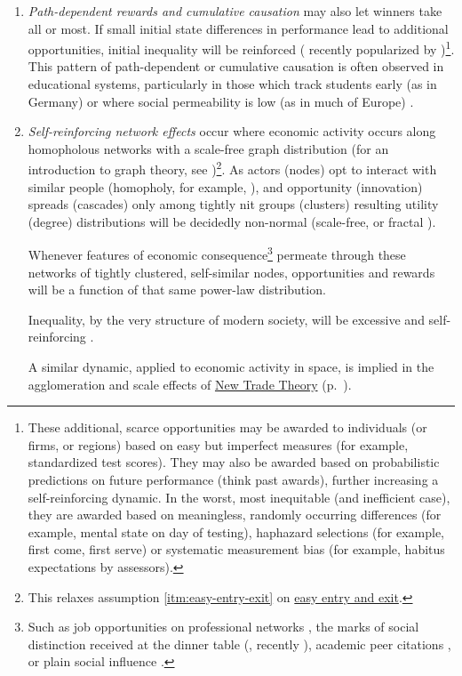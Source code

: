 \begin{enumerate}
	\item {} \label{sec:cumulative-causation} \emph{Path-dependent rewards and cumulative causation} may also let winners take all or most. If small initial state differences in performance lead to additional opportunities, initial inequality will be reinforced (\citealt{Jackson1968, Merton1988} recently popularized by \citealt{Gladwell})\footnote{
		These additional, scarce opportunities may be awarded to individuals (or firms, or regions) based on easy but imperfect measures (for example, standardized test scores). They may also be awarded based on probabilistic predictions on future performance (think past awards), further increasing a self-reinforcing dynamic. In the worst, most inequitable (and inefficient case), they are awarded based on meaningless, randomly occurring differences (for example, mental state on day of testing), haphazard selections (for example, first come, first serve) or systematic measurement bias (for example, habitus expectations by assessors).}. 
	This pattern of path-dependent or cumulative causation is often observed in educational systems, particularly in those which track students early (as in Germany) or where social permeability is low (as in much of Europe) \citep{OECD2006}.

	\item {} \label{sec:network-effects} \emph{Self-reinforcing network effects} occur where economic activity occurs along homopholous networks with a scale-free graph distribution (for an introduction to graph theory, see \citealt{Kleinberg-2009-oz})\footnote{
		This relaxes  assumption \ref{itm:easy-entry-exit} on \hyperref[itm:easy-entry-exit]{easy entry and exit}.}.
	As actors (nodes) opt to interact with similar people (homopholy, for example, \citealt{Mcpherson2001}), and opportunity (innovation) spreads (cascades) only among tightly nit groups (clusters) \citep{Bass1969} resulting utility (degree) distributions will be decidedly non-normal (scale-free, or fractal \citep{Mandelbrot2004}). 
	
	Whenever features of economic consequence\footnote{
		Such as job opportunities on professional networks \citep{Benkler2006}, the marks of social distinction received at the dinner table (\citealt{Bourdieu-1984-aa}, recently \citealt{Hartmann2002}), academic peer citations \citep{Jackson1968, Merton1988}, or plain social influence \citep{Asch}.} 
	permeate through these networks of tightly clustered, self-similar nodes, opportunities and rewards will be a function of that same power-law distribution. 
	
	Inequality, by the very structure of modern society, will be excessive and self-reinforcing \citep{Cozzi2009,Keller2005,Andriani2007}.	
	
	A similar dynamic, applied to economic activity in space, is implied in the agglomeration and scale effects of \hyperref[sec:NTT]{New Trade Theory} (p.~\pageref{sec:NTT}).
\end{enumerate}

